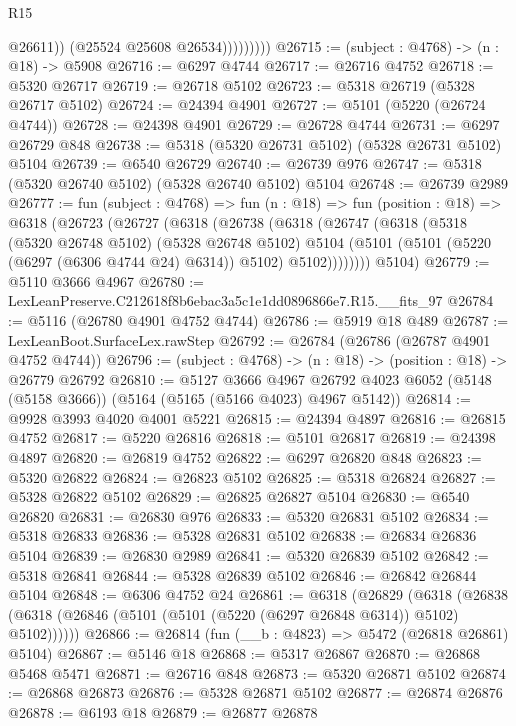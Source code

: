 \begin{lexlean}{R15}
\begin{coremodule}
{{{{{{{{{{{                        @26611))
                    (@25524 @25608 @26534)))))))))
@26715 := (subject : @4768) -> (n : @18) -> @5908
@26716 := @6297 @4744
@26717 := @26716 @4752
@26718 := @5320 @26717
@26719 := @26718 @5102
@26723 := @5318 @26719 (@5328 @26717 @5102)
@26724 := @24394 @4901
@26727 := @5101 (@5220 (@26724 @4744))
@26728 := @24398 @4901
@26729 := @26728 @4744
@26731 := @6297 @26729 @848
@26738 := @5318 (@5320 @26731 @5102) (@5328 @26731 @5102) @5104
@26739 := @6540 @26729
@26740 := @26739 @976
@26747 := @5318 (@5320 @26740 @5102) (@5328 @26740 @5102) @5104
@26748 := @26739 @2989
@26777 := fun (subject : @4768) =>
  fun (n : @18) =>
  fun (position : @18) =>
  @6318
    (@26723
      (@26727
        (@6318
          (@26738
            (@6318
              (@26747
                (@6318
                  (@5318
                    (@5320 @26748 @5102)
                    (@5328 @26748 @5102)
                    @5104
                    (@5101 (@5101 (@5220 (@6297 (@6306 @4744 @24) @6314)) @5102) @5102))))))))
      @5104)
@26779 := @5110 @3666 @4967
@26780 := LexLeanPreserve.C212618f8b6ebac3a5c1e1dd0896866e7.R15.__fits_97
@26784 := @5116 (@26780 @4901 @4752 @4744)
@26786 := @5919 @18 @489
@26787 := LexLeanBoot.SurfaceLex.rawStep
@26792 := @26784 (@26786 (@26787 @4901 @4752 @4744))
@26796 := (subject : @4768) -> (n : @18) -> (position : @18) -> @26779 @26792
@26810 := @5127
    @3666
    @4967
    @26792
    @4023
    @6052
    (@5148 (@5158 @3666))
    (@5164 (@5165 (@5166 @4023) @4967 @5142))
@26814 := @9928 @3993 @4020 @4001 @5221
@26815 := @24394 @4897
@26816 := @26815 @4752
@26817 := @5220 @26816
@26818 := @5101 @26817
@26819 := @24398 @4897
@26820 := @26819 @4752
@26822 := @6297 @26820 @848
@26823 := @5320 @26822
@26824 := @26823 @5102
@26825 := @5318 @26824
@26827 := @5328 @26822 @5102
@26829 := @26825 @26827 @5104
@26830 := @6540 @26820
@26831 := @26830 @976
@26833 := @5320 @26831 @5102
@26834 := @5318 @26833
@26836 := @5328 @26831 @5102
@26838 := @26834 @26836 @5104
@26839 := @26830 @2989
@26841 := @5320 @26839 @5102
@26842 := @5318 @26841
@26844 := @5328 @26839 @5102
@26846 := @26842 @26844 @5104
@26848 := @6306 @4752 @24
@26861 := @6318
    (@26829
      (@6318 (@26838 (@6318 (@26846 (@5101 (@5101 (@5220 (@6297 @26848 @6314)) @5102) @5102))))))
@26866 := @26814 (fun (__b : @4823) => @5472 (@26818 @26861) @5104)
@26867 := @5146 @18
@26868 := @5317 @26867
@26870 := @26868 @5468 @5471
@26871 := @26716 @848
@26873 := @5320 @26871 @5102
@26874 := @26868 @26873
@26876 := @5328 @26871 @5102
@26877 := @26874 @26876
@26878 := @6193 @18
@26879 := @26877 @26878
}}}}}}}}}}}
\end{coremodule}
\end{lexlean}
